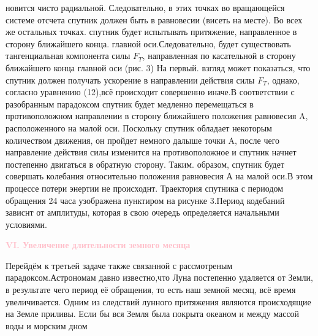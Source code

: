 \leftskip=0cm \rightskip=0cm
\fontsize{14}{10}
\begin{minipage}{8cm}
	новится чисто радиальной. Следовательно, в этих точках во вращающейся системе отсчета спутник должен быть в равновесии (висеть на месте). Во всех же остальных точках. спутник будет испытывать притяжение, направленное в сторону ближайшего конца. главной оси.Следовательно, будет существовать тангенциальная компонента силы $F_T$, направленная по касательной в сторону ближайшего конца главной оси (рис. 3)	На первый. взгляд может показаться,	что спутник должен получать ускорение в направлении действия силы $F_T$, однако, согласно уравнению (12),всё происходит совершенно иначе.В соответствии с разобранным парадоксом спутник будет медленно перемещаться в противоположном направлении в сторону ближайшего положения равновесия A, расположенного на малой оси. Поскольку спутник обладает некоторым количеством движения, он пройдет немного далыше точки A, после чего направление действия силы изменится на противоположное и спутник начнет постепенно	двигаться в обратную сторону. Таким. образом, спутник будет совершать колебания относительно положения равновесия А на малой оси.В этом процессе потери энертии не происходнт. Траектория спутника с периодом обращения 24 часа узображена пунктиром на рисунке 3.Период кодебаний зависнт от амплитуды, которая в свою очередь определяется начальными условиями.
	
	\begin{center}
		\textcolor{pink}{\textbf{VI. Увеличение длительности земного месяца}}
	\end{center}
	
	Перейдём к третьей задаче также связанной с рассмотреным парадоксом.Астрономам давно известно,что Луна постепенно удаляется от Земли, в результате чего период её обращения, то есть наш земной месяц, всё время увеличивается. Одним из следствий лунного притяжения являются происходящие на Земле приливы. Если бы вся Земля была покрыта океаном и между массой воды и морским дном
	
\end{minipage}


